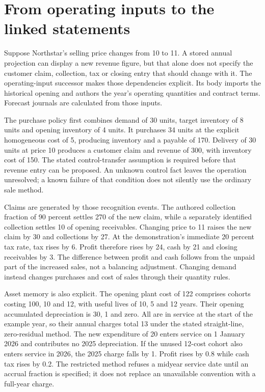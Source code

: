 \section{From operating inputs to the linked statements}
\label{sec:company-input-authoring}

Suppose Northstar's selling price changes from 10 to 11. A stored annual
projection can display a new revenue figure, but that alone does not specify
the customer claim, collection, tax or closing entry that should change with
it. The operating-input successor makes those dependencies explicit. Its
 body imports the historical opening and
authors the year's operating quantities and contract terms. Forecast journals
are calculated from those inputs.

The purchase policy first combines demand of 30 units, target inventory of
8 units and opening inventory of 4 units. It purchases 34 units at the
explicit homogeneous cost of 5, producing inventory and a payable of 170.
Delivery of 30 units at price 10 produces a customer claim and revenue of
300, with inventory cost of 150. The stated control-transfer assumption is
required before that revenue entry can be proposed. An unknown control fact
leaves the operation unresolved; a known failure of that condition does not
silently use the ordinary sale method.

Claims are generated by those recognition events. The authored collection
fraction of 90 percent settles 270 of the new claim, while a separately
identified collection settles 10 of opening receivables. Changing price to
11 raises the new claim by 30 and collections by 27. At the demonstration's
immediate 20 percent tax rate, tax rises by 6. Profit therefore rises by 24,
cash by 21 and closing receivables by 3. The difference between profit and
cash follows from the unpaid part of the increased sales, not a balancing
adjustment. Changing demand instead changes purchases and cost of sales
through their quantity rules.

Asset memory is also explicit. The opening plant cost of 122 comprises
cohorts costing 100, 10 and 12, with useful lives of 10, 5 and 12 years.
Their opening accumulated depreciation is 30, 1 and zero. All are in service
at the start of the example year, so their annual charges total 13 under
the stated straight-line, zero-residual method. The new expenditure of 20
enters service on 1 January 2026 and contributes no 2025 depreciation. If the
unused 12-cost cohort also enters service in 2026, the 2025 charge falls by
1. Profit rises by 0.8 while cash tax rises by 0.2. The restricted method
refuses a midyear service date until an accrual fraction is specified; it
does not replace an unavailable convention with a full-year charge.

